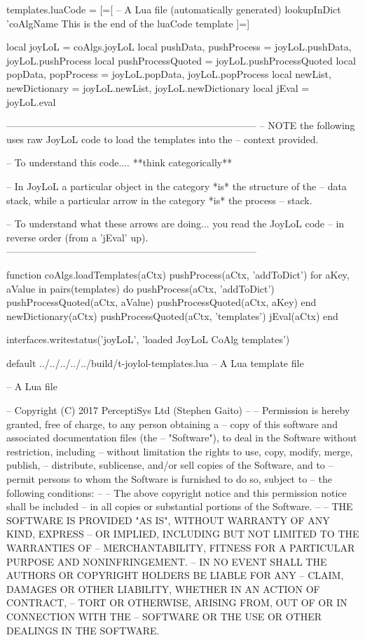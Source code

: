 templates.luaCode = [=[
-- A Lua file (automatically generated)
{{ lookupInDict 'coAlgName }}
This is the end of the luaCode template
]=]

local joyLoL = coAlgs.joyLoL
local pushData, pushProcess = joyLoL.pushData, joyLoL.pushProcess
local pushProcessQuoted = joyLoL.pushProcessQuoted
local popData, popProcess   = joyLoL.popData, joyLoL.popProcess
local newList, newDictionary = joyLoL.newList, joyLoL.newDictionary
local jEval = joyLoL.eval

-----------------------------------------------------------------------------
-- NOTE the following uses raw JoyLoL code to load the templates into the 
-- context provided. 

-- To understand this code.... **think categorically**

-- In JoyLoL a particular object in the category *is* the structure of the 
-- data stack, while a particular arrow in the category *is* the process 
-- stack.

-- To understand what these arrows are doing... you read the JoyLoL code 
-- in reverse order (from a 'jEval' up). 
-----------------------------------------------------------------------------

function coAlgs.loadTemplates(aCtx)
  pushProcess(aCtx, 'addToDict')
  for aKey, aValue in pairs(templates) do
    pushProcess(aCtx, 'addToDict')
    pushProcessQuoted(aCtx, aValue)
    pushProcessQuoted(aCtx, aKey)
  end
  newDictionary(aCtx)
  pushProcessQuoted(aCtx, 'templates')
  jEval(aCtx)
end

interfaces.writestatus('joyLoL', 'loaded JoyLoL CoAlg templates')
\stopLuaTemplate

\createLuaTemplateFile%
  {default}%
  {../../../../../build/t-joylol-templates.lua}%
  {-- A Lua template file}

\startMinJoyLoL
-- A Lua file

-- Copyright (C) 2017 PerceptiSys Ltd (Stephen Gaito)
--
-- Permission is hereby granted, free of charge, to any person obtaining a 
-- copy of this software and associated documentation files (the 
-- "Software"), to deal in the Software without restriction, including 
-- without limitation the rights to use, copy, modify, merge, publish, 
-- distribute, sublicense, and/or sell copies of the Software, and to 
-- permit persons to whom the Software is furnished to do so, subject to 
-- the following conditions:
--
-- The above copyright notice and this permission notice shall be included 
-- in all copies or substantial portions of the Software.
--
-- THE SOFTWARE IS PROVIDED "AS IS", WITHOUT WARRANTY OF ANY KIND, EXPRESS 
-- OR IMPLIED, INCLUDING BUT NOT LIMITED TO THE WARRANTIES OF 
-- MERCHANTABILITY, FITNESS FOR A PARTICULAR PURPOSE AND NONINFRINGEMENT. 
-- IN NO EVENT SHALL THE AUTHORS OR COPYRIGHT HOLDERS BE LIABLE FOR ANY 
-- CLAIM, DAMAGES OR OTHER LIABILITY, WHETHER IN AN ACTION OF CONTRACT, 
-- TORT OR OTHERWISE, ARISING FROM, OUT OF OR IN CONNECTION WITH THE 
-- SOFTWARE OR THE USE OR OTHER DEALINGS IN THE SOFTWARE.


